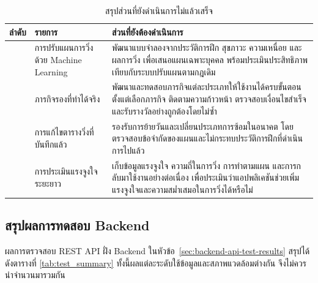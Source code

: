 \begin{table}[H]
\centering
\caption{สรุปส่วนที่ยังดำเนินการไม่แล้วเสร็จ}
\label{tab:remaining-work}
\small
\begingroup
\setlength{\tabcolsep}{4pt}
\renewcommand{\arraystretch}{1.15}
\begin{tabular}{|>{\centering\arraybackslash}p{}|>{\raggedright\arraybackslash}p{}|>{\raggedright\arraybackslash}p{}|}
\hline
\textbf{ลำดับ} & \textbf{รายการ} & \textbf{ส่วนที่ยังต้องดำเนินการ} \\ \hline
1 & การปรับแผนการวิ่งด้วย Machine Learning & พัฒนาแบบจำลองจากประวัติการฝึก สุขภาวะ ความเหนื่อย และผลการวิ่ง เพื่อเสนอแผนเฉพาะบุคคล พร้อมประเมินประสิทธิภาพเทียบกับระบบปรับแผนตามกฎเดิม \\ \hline
2 & ภารกิจรองที่ทำได้จริง & พัฒนาและทดสอบภารกิจแต่ละประเภทให้ใช้งานได้ครบขั้นตอน ตั้งแต่เลือกภารกิจ ติดตามความก้าวหน้า ตรวจสอบเงื่อนไขสำเร็จ และรับรางวัลอย่างถูกต้องโดยไม่ซ้ำ \\ \hline
3 & การแก้ไขตารางวิ่งที่บันทึกแล้ว & รองรับการย้ายวันและเปลี่ยนประเภทการซ้อมในอนาคต โดยตรวจสอบข้อจำกัดของแผนและไม่กระทบประวัติการฝึกที่ดำเนินการไปแล้ว \\ \hline
4 & การประเมินแรงจูงใจระยะยาว & เก็บข้อมูลแรงจูงใจ ความถี่ในการวิ่ง การทำตามแผน และการกลับมาใช้งานอย่างต่อเนื่อง เพื่อประเมินว่าแอปพลิเคชันช่วยเพิ่มแรงจูงใจและความสม่ำเสมอในการวิ่งได้หรือไม่ \\ \hline
\end{tabular}
\endgroup
\end{table}

\subsection{สรุปผลการทดสอบ Backend}

ผลการตรวจสอบ REST API ฝั่ง Backend ในหัวข้อ~\ref{sec:backend-api-test-results} สรุปได้ดังตารางที่ \ref{tab:test_summary} ทั้งนี้ผลแต่ละระดับใช้ข้อมูลและสภาพแวดล้อมต่างกัน จึงไม่ควรนำจำนวนมารวมกัน

